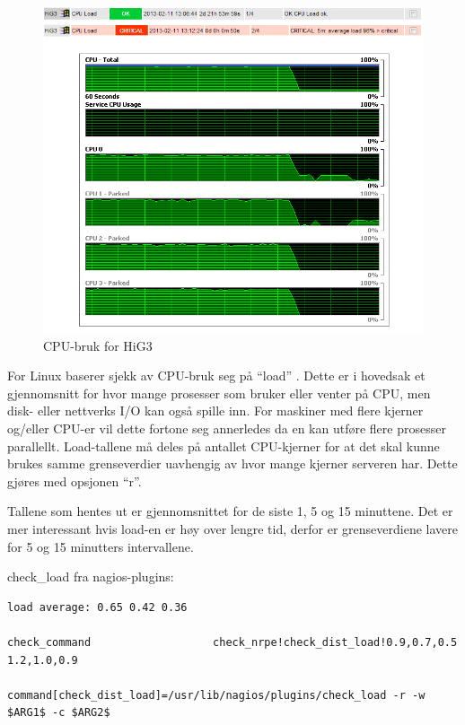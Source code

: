 \begin{figure}
    \centering
    \includegraphics[scale=0.6]{img/cpu_test_hig3}
    \caption{CPU-bruk for HiG3}
    \label{cpustrain}
\end{figure}


For Linux baserer sjekk av CPU-bruk seg på “load” \cite{loadavg} \cite{wiki:loadavg}. Dette er i hovedsak et gjennomsnitt for hvor mange prosesser som bruker eller venter på CPU, men disk- eller nettverks I/O kan også spille inn. For maskiner med flere kjerner og/eller CPU-er vil dette fortone seg annerledes da en kan utføre flere prosesser parallellt. Load-tallene må deles på antallet CPU-kjerner for at det skal kunne brukes samme grenseverdier uavhengig av hvor mange kjerner serveren har. Dette gjøres med opsjonen “r”.

Tallene som hentes ut er gjennomsnittet for de siste 1, 5 og 15 minuttene. Det er mer interessant hvis load-en er høy over lengre tid, derfor er grenseverdiene lavere for 5 og 15 minutters intervallene.

check\_load fra nagios-plugins:
\begin{lstlisting}
load average: 0.65 0.42 0.36

check_command                   check_nrpe!check_dist_load!0.9,0.7,0.5 1.2,1.0,0.9

command[check_dist_load]=/usr/lib/nagios/plugins/check_load -r -w $ARG1$ -c $ARG2$
\end{lstlisting}

